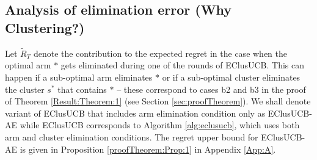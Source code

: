 % 
%
%
%
%
%
\subsection*{Analysis of elimination error (Why Clustering?)}
Let $\widetilde R_T$ denote the contribution  to the expected regret in the case when the optimal arm $*$ gets eliminated during one of the rounds of EClusUCB. This can happen if a sub-optimal arm eliminates $*$ or if a sub-optimal cluster eliminates the cluster $s^*$ that contains $*$ -- these correspond to cases b2 and b3 in the proof of Theorem \ref{Result:Theorem:1} (see Section \ref{sec:proofTheorem}). 
We shall denote variant of EClusUCB that includes arm elimination condition only as EClusUCB-AE while EClusUCB corresponds to Algorithm \ref{alg:eclusucb}, which uses both arm and cluster elimination conditions. The regret upper bound for EClusUCB-AE is given in Proposition \ref{proofTheorem:Prop:1} in Appendix \ref{App:A}.

